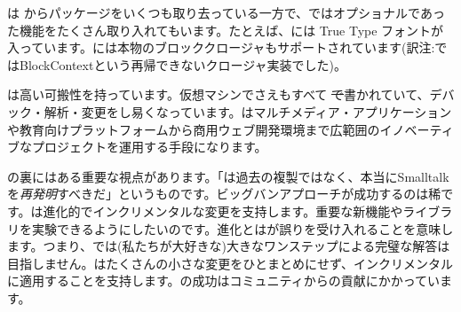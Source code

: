 \documentclass[a4paper,10pt,twoside]{book}
\begin{document}
\pharo は \squeak からパッケージをいくつも取り去っている一方で、\squeak ではオプショナルであった機能をたくさん取り入れてもいます。たとえば、\pharo には True Type フォントが入っています。\pharo には本物のブロッククロージャもサポートされています(訳注:\squeak ではBlockContextという再帰できないクロージャ実装でした)。

\pharo は高い可搬性を持っています。仮想マシンでさえもすべて \st で書かれていて、デバック・解析・変更をし易くなっています。\pharo はマルチメディア・アプリケーションや教育向けプラットフォームから商用ウェブ開発環境まで広範囲のイノベーティブなプロジェクトを運用する手段になります。

\pharo の裏にはある重要な視点があります。「\pharo は過去の複製ではなく、本当にSmalltalkを\emph{再発明}すべきだ」というものです。ビッグバンアプローチが成功するのは稀です。\pharo は進化的でインクリメンタルな変更を支持します。重要な新機能やライブラリを実験できるようにしたいのです。進化とは\pharo が誤りを受け入れることを意味します。つまり、\pharo では(私たちが大好きな)大きなワンステップによる完璧な解答は目指しません。\pharo はたくさんの小さな変更をひとまとめにせず、インクリメンタルに適用することを支持します。\pharo の成功はコミュニティからの貢献にかかっています。

\end{document}

